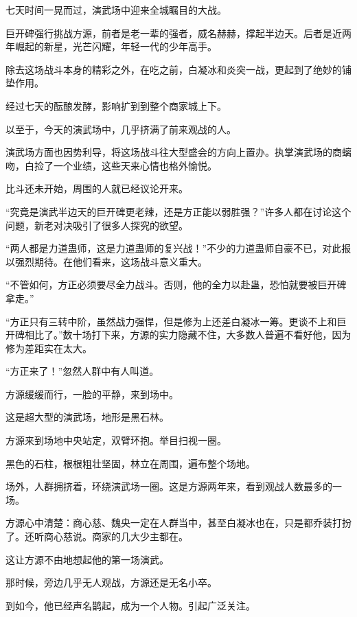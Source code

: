 
\begin{this_body}



七天时间一晃而过，演武场中迎来全城瞩目的大战。

巨开碑强行挑战方源，前者是老一辈的强者，威名赫赫，撑起半边天。后者是近两年崛起的新星，光芒闪耀，年轻一代的少年高手。

除去这场战斗本身的精彩之外，在吃之前，白凝冰和炎突一战，更起到了绝妙的铺垫作用。

经过七天的酝酿发酵，影响扩到到整个商家城上下。

以至于，今天的演武场中，几乎挤满了前来观战的人。

演武场方面也因势利导，将这场战斗往大型盛会的方向上置办。执掌演武场的商螭吻，白捡了一个业绩，这些天来心情也格外愉悦。

比斗还未开始，周围的人就已经议论开来。

“究竟是演武半边天的巨开碑更老辣，还是方正能以弱胜强？”许多人都在讨论这个问题，新老对决吸引了很多人探究的欲望。

“两人都是力道蛊师，这是力道蛊师的复兴战！”不少的力道蛊师自豪不已，对此报以强烈期待。在他们看来，这场战斗意义重大。

“不管如何，方正必须要尽全力战斗。否则，他的全力以赴蛊，恐怕就要被巨开碑拿走。”

“方正只有三转中阶，虽然战力强悍，但是修为上还差白凝冰一筹。更谈不上和巨开碑相比了。”数十场打下来，方源的实力隐藏不住，大多数人普遍不看好他，因为修为差距实在太大。

“方正来了！”忽然人群中有人叫道。

方源缓缓而行，一脸的平静，来到场中。

这是超大型的演武场，地形是黑石林。

方源来到场地中央站定，双臂环抱。举目扫视一圈。

黑色的石柱，根根粗壮坚固，林立在周围，遍布整个场地。

场外，人群拥挤着，环绕演武场一圈。这是方源两年来，看到观战人数最多的一场。

方源心中清楚：商心慈、魏央一定在人群当中，甚至白凝冰也在，只是都乔装打扮了。还听商心慈说。商家的几大少主都在。

这让方源不由地想起他的第一场演武。

那时候，旁边几乎无人观战，方源还是无名小卒。

到如今，他已经声名鹊起，成为一个人物。引起广泛关注。


\end{this_body}
